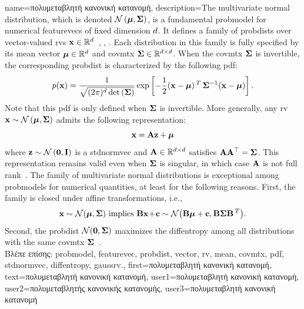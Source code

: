 {name={\foreignlanguage{greek}{πολυμεταβλητή κανονική κατανομή}}, 
	description={The multivariate normal distribution, 
		which is denoted $\mathcal{N}\left({\bm \mu},{\bf \Sigma}\right)$, is a fundamental 
		\gls{probmodel} for numerical \gls{featurevec}s of fixed dimension $d$. 
		It defines a family of \gls{probdist}s over \gls{vector}-valued \gls{rv}s 
		${\bf x} \in \mathbb{R}^{d}$~\cite{BertsekasProb}, \cite{GrayProbBook}, \cite{Lapidoth09}. 
		Each distribution in this family is fully specified by its \gls{mean} \gls{vector} 
		${\bm \mu} \in \mathbb{R}^{d}$ and \gls{covmtx} 
		${\bf \Sigma} \in \mathbb{R}^{d \times d}$. When the 
		\gls{covmtx} ${\bf \Sigma}$ is invertible, the corresponding \gls{probdist} is 
		characterized by the following \gls{pdf}:
		\[p({\bf x}) = 
 		\frac{1}{\sqrt{(2\pi)^{d} \det\,({\bf \Sigma})}} 
 		\exp\left[ -\frac{1}{2} 
 		({\bf x} - {\bm \mu})\,^{T}\, {\bf \Sigma}^{-1} 
 		({\bf x} - {\bm \mu}) \right].
 		\]
		Note that this \gls{pdf} is only defined when ${\bf \Sigma}$ is invertible.
   		More generally, any \gls{rv} ${\bf x} \sim \mathcal{N}\left({\bm \mu},{\bf \Sigma}\right)$ 
   		admits the following representation:
  		\[
    		{\bf x} = {\bf A} {\bf z} + {\bm \mu}
   		\]
   		where ${\bf z} \sim \mathcal{N}\left(\mathbf{0},\mathbf{I}\right)$ is a \gls{stdnormvec} 
   		and ${\bf A} \in \mathbb{R}^{d \times d}$ satisfies ${\bf A} {\bf A}^\top = {\bf \Sigma}$. 
   		This representation remains valid even when ${\bf \Sigma}$ is singular, in which case ${\bf A}$ 
   		is not full rank~\cite[Ch. 23]{Lapidoth2017}.
   		The family of multivariate normal distributions is exceptional among \gls{probmodel}s for numerical 
   		quantities, at least for the following reasons. First, the family is closed under affine 
   		transformations, i.e.,
		\[ 
		{\bf x} \sim \mathcal{N}({\bm \mu},{\bf \Sigma}) \mbox{ implies } 
		{\bf B}{\bf x}\!+\!{\bf c} \sim \mathcal{N}\big( {\bf B}{\bm \mu}+{\bf c},{\bf B} {\bf \Sigma} {\bf B}\,^{T} \big). 
		\]
		Second, the \gls{probdist} $\mathcal{N}(\mathbf{0},{\bf \Sigma})$ maximizes the 
		\gls{diffentropy} among all distributions with the same \gls{covmtx} ${\bf \Sigma}$~\cite{coverthomas}. \\ 
		\foreignlanguage{greek}{Βλέπε επίσης:} \gls{probmodel}, \gls{featurevec}, \gls{probdist}, \gls{vector}, \gls{rv}, \gls{mean}, 
		\gls{covmtx}, \gls{pdf}, \gls{stdnormvec}, \gls{diffentropy}, \gls{gaussrv}.}, 
	first={\foreignlanguage{greek}{πολυμεταβλητή κανονική κατανομή}},
	text={\foreignlanguage{greek}{πολυμεταβλητή κανονική κατανομή}},
	user1={\foreignlanguage{greek}{πολυμεταβλητή κανονική κατανομή}}, %
	user2={\foreignlanguage{greek}{πολυμεταβλητής κανονικής κατανομής}}, %
	user3={\foreignlanguage{greek}{πολυμεταβλητή κανονική κατανομή}} %
}

